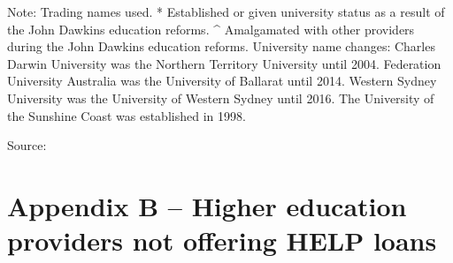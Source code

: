 \documentclass{grattan}
\begin{document}

Note: Trading names used. * Established or given university status as a result of the John Dawkins education reforms. \^{} Amalgamated with other providers during the John Dawkins education reforms. University name changes: Charles Darwin University was the Northern Territory University until 2004. Federation University Australia was the University of Ballarat until 2014. Western Sydney University was the University of Western Sydney until 2016. The University of the Sunshine Coast was established in 1998.

Source: \textcite[][]{TEQSA2018statisticsreporto}

%
\chapter{Appendix B -- Higher education providers not offering HELP loans}\label{chap:appendix-b-higher-education-providers-not-offering-help-loans}
\end{document}
